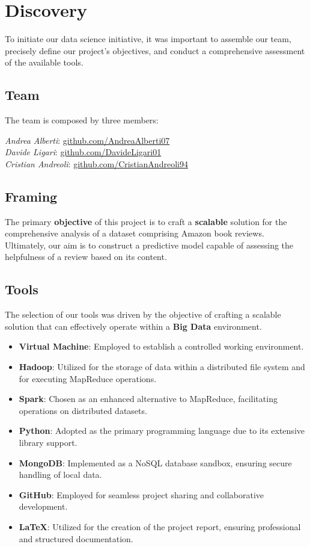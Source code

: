 \section{Discovery}
To initiate our data science initiative, it was important to assemble our team, precisely define our project's objectives, 
and conduct a comprehensive assessment of the available tools.

\subsection*{Team}
The team is composed by three members:

\noindent
\textit{Andrea Alberti}: \href{https://github.com/AndreaAlberti07}{github.com/AndreaAlberti07}\\
\textit{Davide Ligari}: \href{https://github.com/DavideLigari01}{github.com/DavideLigari01}\\
\textit{Cristian Andreoli}: \href{https://github.com/CristianAndreoli94}{github.com/CristianAndreoli94}\\

\subsection*{Framing}
The primary \textbf{objective} of this project is to craft a \textbf{scalable} solution for the comprehensive analysis of a dataset comprising 
Amazon book reviews. Ultimately, our aim is to construct a predictive model capable of assessing the helpfulness of a review based on its content.

\subsection*{Tools}
The selection of our tools was driven by the objective of crafting a scalable solution that can effectively operate within a \textbf{Big Data} environment.

\begin{itemize}[leftmargin=*, noitemsep]
    \item \textbf{Virtual Machine}: Employed to establish a controlled working environment.
    \item \textbf{Hadoop}: Utilized for the storage of data within a distributed file system and for executing MapReduce operations.
    \item \textbf{Spark}: Chosen as an enhanced alternative to MapReduce, facilitating operations on distributed datasets.
    \item \textbf{Python}: Adopted as the primary programming language due to its extensive library support.
    \item \textbf{MongoDB}: Implemented as a NoSQL database sandbox, ensuring secure handling of local data.
    \item \textbf{GitHub}: Employed for seamless project sharing and collaborative development.
    \item \textbf{LaTeX}: Utilized for the creation of the project report, ensuring professional and structured documentation.
\end{itemize}





